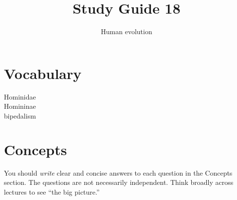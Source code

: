 \documentclass[letterpaper]{tufte-handout}
\title{Study Guide 18\hfill}
\author{Human evolution}
\date{} %
\begin{document}
\maketitle	%

\section{Vocabulary}

\begin{multicols}{2}
Hominidae \\
Homininae \\
bipedalism 
\end{multicols}


\section{Concepts}

You should \emph{write} clear and concise answers to each question in the Concepts section.  The questions are not necessarily independent.  Think broadly across lectures to see ``the big picture.'' 
\end{document}
